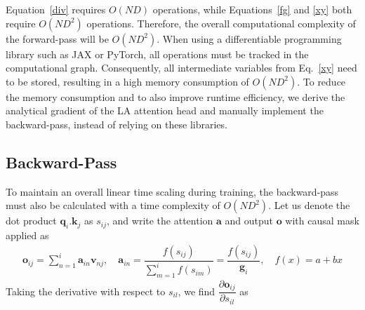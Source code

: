 \par Equation~\ref{div} requires $O(ND)$ operations, while Equations~\ref{fg} and \ref{xy} both require $O(ND^2)$ operations. Therefore, the overall computational complexity of the forward-pass will be $O(ND^2)$. When using a differentiable programming library such as JAX or PyTorch, all operations must be tracked in the computational graph. Consequently, all intermediate variables from Eq.~\ref{xy} need to be stored, resulting in a high memory consumption of $O(ND^2)$. To reduce the memory consumption and to also improve runtime efficiency, we derive the analytical gradient of the LA attention head and manually implement the backward-pass, instead of relying on these libraries.

\subsection{Backward-Pass}
\label{custom_gradients}
\par To maintain an overall linear time scaling during training, the backward-pass must also be calculated with a time complexity of $O(ND^2)$. Let us denote the dot product $\mathbf{q}_{i}.\mathbf{k}_{j}$ as $s_{ij}$, and write the attention $\mathbf{a}$ and output $\mathbf{o}$ with causal mask applied as
\begin{gather}
    \mathbf{o}_{ij} = \sum_{n=1}^{i}{\mathbf{a}_{in}\mathbf{v}_{nj}},\quad \mathbf{a}_{in} = \dfrac{f(s_{ij})}{\sum_{m=1}^{i}f(s_{im})} = \dfrac{f(s_{ij})}{\mathbf{g}_{i}},\quad f(x) = a + bx
\end{gather}
Taking the derivative with respect to $s_{il}$, we find $\dfrac{\partial\mathbf{o}_{ij}}{\partial s_{il}}$ as

